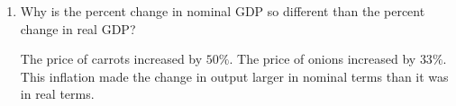 \documentclass{assignment}
\begin{document}
\begin{enumerate}
\begin{enumerate}
\end{enumerate}

\item Why is the percent change in nominal GDP so different than the percent change in real GDP?

\begin{solution}
The price of carrots increased by $50\%$. The price of onions increased by $33\%$. This inflation made the change in output larger in nominal terms than it was in real terms.
\end{solution}

\end{enumerate}
\end{document}
